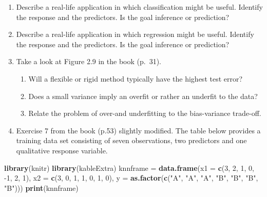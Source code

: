 \documentclass[]{article}
\newenvironment{Shaded}{\begin{snugshade}}{\end{snugshade}}
\newcommand{\DataTypeTok}[1]{\textcolor[rgb]{0.13,0.29,0.53}{#1}}
\newcommand{\DecValTok}[1]{\textcolor[rgb]{0.00,0.00,0.81}{#1}}
\newcommand{\KeywordTok}[1]{\textcolor[rgb]{0.13,0.29,0.53}{\textbf{#1}}}
\newcommand{\NormalTok}[1]{#1}
\newcommand{\StringTok}[1]{\textcolor[rgb]{0.31,0.60,0.02}{#1}}
\providecommand{\tightlist}{%
  \setlength{\itemsep}{0pt}\setlength{\parskip}{0pt}}
\begin{document}
\begin{enumerate}
\def\labelenumi{\arabic{enumi}.}
\item
  Describe a real-life application in which classification might be
  useful. Identify the response and the predictors. Is the goal
  inference or prediction?
\item
  Describe a real-life application in which regression might be useful.
  Identify the response and the predictors. Is the goal inference or
  prediction?
\item
  Take a look at Figure 2.9 in the book (p.~31).

  \begin{enumerate}
  \def\labelenumii{\alph{enumii}.}
  \tightlist
  \item
    Will a flexible or rigid method typically have the highest test
    error?
  \item
    Does a small variance imply an overfit or rather an underfit to the
    data?
  \item
    Relate the problem of over-and underfitting to the bias-variance
    trade-off.
  \end{enumerate}
\item
  Exercise 7 from the book (p.53) slightly modified. The table below
  provides a training data set consisting of seven observations, two
  predictors and one qualitative response variable.
\end{enumerate}

\begin{Shaded}
\begin{Highlighting}[]
\KeywordTok{library}\NormalTok{(knitr)}
\KeywordTok{library}\NormalTok{(kableExtra)}
\NormalTok{knnframe =}\StringTok{ }\KeywordTok{data.frame}\NormalTok{(}\DataTypeTok{x1 =} \KeywordTok{c}\NormalTok{(}\DecValTok{3}\NormalTok{, }\DecValTok{2}\NormalTok{, }\DecValTok{1}\NormalTok{, }\DecValTok{0}\NormalTok{, }\DecValTok{-1}\NormalTok{, }\DecValTok{2}\NormalTok{, }\DecValTok{1}\NormalTok{), }\DataTypeTok{x2 =} \KeywordTok{c}\NormalTok{(}\DecValTok{3}\NormalTok{, }\DecValTok{0}\NormalTok{, }\DecValTok{1}\NormalTok{, }\DecValTok{1}\NormalTok{, }
    \DecValTok{0}\NormalTok{, }\DecValTok{1}\NormalTok{, }\DecValTok{0}\NormalTok{), }\DataTypeTok{y =} \KeywordTok{as.factor}\NormalTok{(}\KeywordTok{c}\NormalTok{(}\StringTok{"A"}\NormalTok{, }\StringTok{"A"}\NormalTok{, }\StringTok{"A"}\NormalTok{, }\StringTok{"B"}\NormalTok{, }\StringTok{"B"}\NormalTok{, }\StringTok{"B"}\NormalTok{, }\StringTok{"B"}\NormalTok{)))}
\KeywordTok{print}\NormalTok{(knnframe)}
\end{Highlighting}
\end{Shaded}
\end{document}
